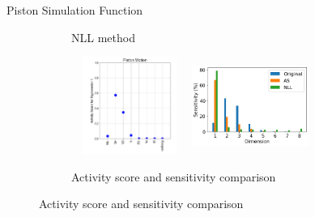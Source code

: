 \documentclass[10pt]{beamer}
\begin{document}
\begin{frame}{Piston Simulation Function}
\begin{figure}
\begin{subfigure}{0.3\textwidth}
    \caption{NLL method}
\end{subfigure}
\hfill
\begin{subfigure}{0.3\textwidth}
    \includegraphics[height=1.25in,width=1.5in]{images/PEC.png}
    \includegraphics[height=1.25in,width=1.5in]{images/piston sens.png}
    \captionsetup{justification=centering}
    \caption{Activity score and sensitivity comparison}
\end{subfigure}
\end{figure}
\end{frame}
\end{document}
